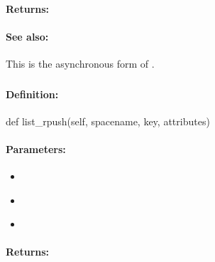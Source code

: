 \paragraph{Returns:}


\paragraph{See also:}  This is the asynchronous form of .

\pagebreak
\subsubsection{}
\label{api:python:list_rpush}


\paragraph{Definition:}
\begin{pythoncode}
def list_rpush(self, spacename, key, attributes)
\end{pythoncode}

\paragraph{Parameters:}
\begin{itemize}[noitemsep]
\item {}\\

\item {}\\

\item {}\\

\end{itemize}

\paragraph{Returns:}


\pagebreak
\subsubsection{}
\label{api:python:async_list_rpush}


